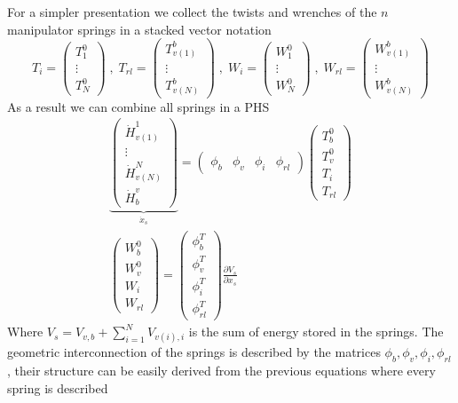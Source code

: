 \documentclass[a4paper,twoside, openright,12pt]{report}
\begin{document}
For a simpler presentation we collect the twists and wrenches of the $n$ manipulator springs in a stacked vector notation
\[ T_i = \begin{pmatrix}T_1^0 \\ \vdots \\ T_N^0\end{pmatrix} \; , \; 
T_{rl} = \begin{pmatrix}T_{v(1)}^b \\ \vdots \\ T_{v(N)}^b\end{pmatrix} \; , \; W_i = \begin{pmatrix}W_1^0 \\ \vdots \\ W_N^0\end{pmatrix} \; , \;
W_{rl} = \begin{pmatrix}W_{v(1)}^b \\ \vdots \\ W_{v(N)}^b\end{pmatrix} \]
As a result we can combine all springs in a PHS
\begin{eqnarray}\label{EQ:PHScombinedsprings}
\underbrace{\begin{pmatrix}\dot{H}_{v(1)}^1 \\ \vdots \\ \dot{H}_{v(N)}^N \\ \dot{H}_b^v \end{pmatrix}}_{\dot{x}_s} =
\begin{pmatrix}
\phi_b & \phi_v & \phi_i & \phi_{rl}\end{pmatrix}
\begin{pmatrix}T_b^0 \\ T_v^0 \\ T_i \\ T_{rl}\end{pmatrix}
\\
\begin{pmatrix}W_b^0 \\ W_v^0 \\ W_i \\ W_{rl}\end{pmatrix} = 
\begin{pmatrix} \phi_b^T \\ \phi_v^T \\ \phi_i^T \\ \phi_{rl}^T\end{pmatrix} \frac{\partial V_s}{\partial x_s}
\end{eqnarray}
Where $V_s = V_{v,b} + \sum_{i=1}^N V_{v(i),i} $ is the sum of energy stored in the springs. The geometric interconnection of the springs is described by the matrices $\phi_b , \phi_v , \phi_i , \phi_{rl}$, their structure can be easily derived from the previous equations where every spring is described 
\end{document}
